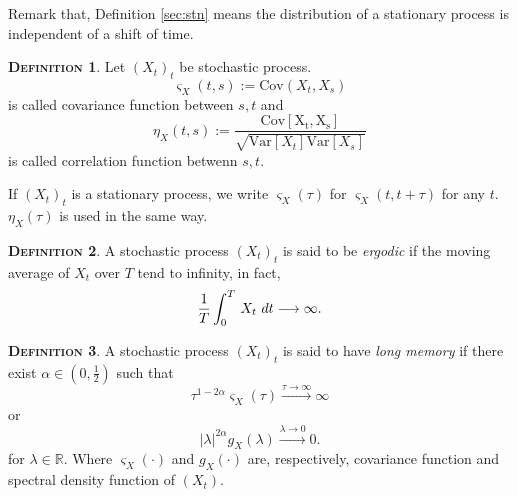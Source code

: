 \documentclass[a4paper, twoside, 11pt]{article}
\theoremstyle{definition}
\newtheorem{definition}{\scshape Definition}[section]
\begin{document}
Remark that, Definition \ref{sec:stn} means the distribution of a stationary process is independent of a shift of time.

\begin{definition}
  Let $(X_t)_t$ be stochastic process. 
  \begin{equation*}
	\varsigma_X(t,s) := \mathrm{Cov}(X_t, X_s) 
  \end{equation*} is called covariance function between $s, t$ and 
  \begin{equation*}
	\eta_X(t, s) := \frac{\mathrm{Cov[X_t, X_s]}}{\sqrt{\mathrm{Var}[X_t]\mathrm{Var}[X_s]}}
  \end{equation*}
  is called correlation function betwenn $s, t$.
\end{definition}
If $(X_t)_t$ is a stationary process, we write $\varsigma_X(\tau)$ for $\varsigma_X(t, t+\tau)$ for any $t$. $\eta_X(\tau)$ is used in the same way.

\begin{definition}
  A stochastic process $(X_t)_t$ is said to be \emph{ergodic} if the moving average of $X_t$ over $T$ tend to infinity, in fact,
  \begin{equation}
	\frac{1}{T}\int_0^T\,X_t\,\mathop{dt} \longrightarrow \infty\nonumber\\.
  \end{equation}
	\label{sec:erg}
\end{definition}

\begin{definition}
  A stochastic process $(X_t)_t$ is said to have \emph{long memory} if there exist  $\alpha \in (0, \frac{1}{2})$ such that
  \begin{equation}
	\tau ^{1 - 2\alpha} \varsigma_X(\tau) \overset{\tau\rightarrow \infty}{\longrightarrow} \infty
	\label{sec:lm1}
  \end{equation}
   or 
  \begin{equation}
	|\lambda|^{2\alpha}g_X(\lambda) \overset{\lambda\rightarrow 0}{\longrightarrow} 0 .
	\label{sec:lm2}
  \end{equation}
  for $\lambda \in \mathbb{R}$. Where $\varsigma_X(\cdot)$ and $g_X(\cdot)$ are, respectively, covariance function and spectral density function of $(X_t)$.
 
\end{definition}

\end{document}
